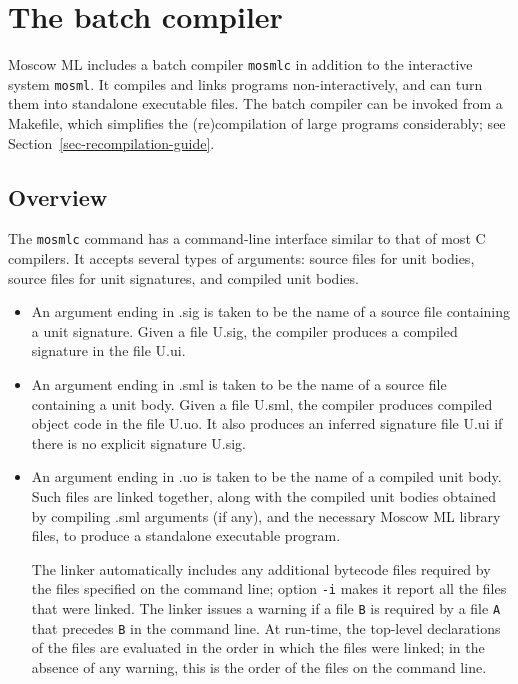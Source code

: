 \documentclass[fleqn]{article}
\begin{document}
\newpage

\section{The batch compiler}
\label{sec-batch-compiler}

Moscow ML includes a batch compiler {\tt mosmlc} in addition to the
interactive system {\tt mosml}.  It compiles and links programs
non-interactively, and can turn them into standalone executable files.
The batch compiler can be invoked from a Makefile, which simplifies
the (re)compilation of large programs considerably; see
Section~\ref{sec-recompilation-guide}.


\subsection{Overview}

The {\tt mosmlc} command has a command-line interface similar to that
of most C compilers.  It accepts several types of arguments: source
files for unit bodies, source files for unit signatures, and compiled
unit bodies.

\begin{itemize}
\item An argument ending in .sig is taken to be the name of a source
  file containing a unit signature.  Given a file U.sig, the compiler
  produces a compiled signature in the file U.ui.

\item An argument ending in .sml is taken to be the name of a source
  file containing a unit body.  Given a file U.sml, the compiler
  produces compiled object code in the file U.uo.  It also produces an
  inferred signature file U.ui if there is no explicit signature U.sig.

\item An argument ending in .uo is taken to be the name of a compiled
  unit body.  Such files are linked together, along with the compiled
  unit bodies obtained by compiling .sml arguments (if any), and the
  necessary Moscow ML library files, to produce a standalone
  executable program.  

  The linker automatically includes any additional bytecode files
  required by the files specified on the command line; option {\tt -i}
  makes it report all the files that were linked.  The linker issues a
  warning if a file {\tt B} is required by a file {\tt A} that
  precedes {\tt B} in the command line.  At run-time, the top-level
  declarations of the files are evaluated in the order in which the
  files were linked; in the absence of any warning, this is the order
  of the files on the command line.
\end{itemize}
\end{document}
